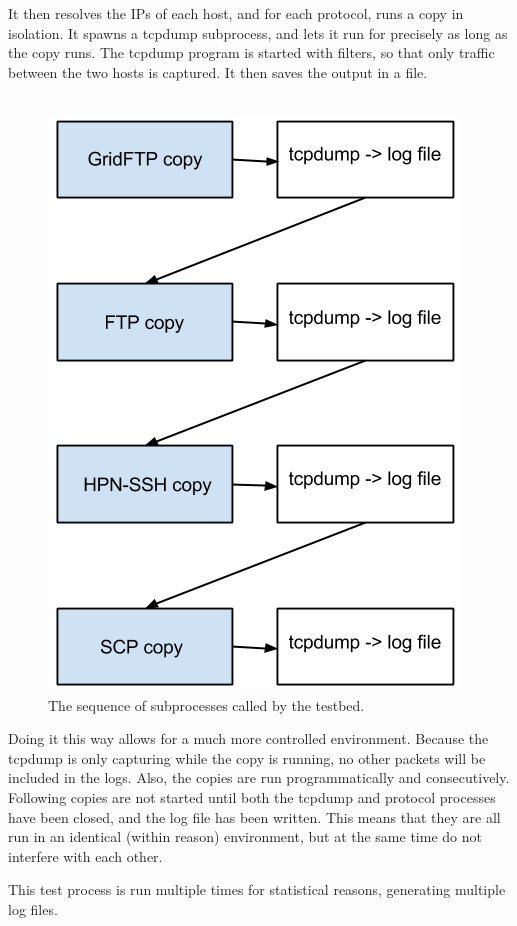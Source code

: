 \documentclass{sig-alternate-05-2015}
\begin{document}
It then resolves the IPs of each host, and for each protocol, runs a copy in isolation. It spawns a tcpdump subprocess, and lets it run for precisely as long as the copy runs. The tcpdump program is started with filters, so that only traffic between the two hosts is captured. It then saves the output in a file.\\\\
\begin{figure}[H]
	\label{fig:testbed_sequence}
	\centering
	\includegraphics[height=0.5\textheight]{img/seq_example}
	\caption{The sequence of subprocesses called by the testbed.}
\end{figure}
Doing it this way allows for a much more controlled environment. Because the tcpdump is only capturing while the copy is running, no other packets will be included in the logs. Also, the copies are run programmatically and consecutively. Following copies are not started until both the tcpdump and protocol processes have been closed, and the log file has been written. This means that they are all run in an identical (within reason) environment, but at the same time do not interfere with each other.

This test process is run multiple times for statistical reasons, generating multiple log files.
\end{document}
